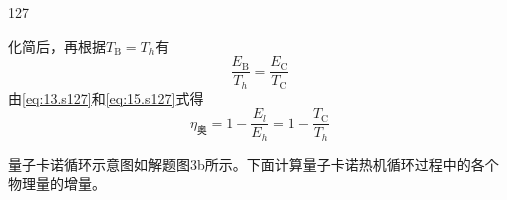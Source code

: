 \begin{solution}{127}
\begin{subsolution}
\begin{equation}
            \label{eq:14.s127}
        \end{equation}
        化简后，再根据$T _ { \mathrm { B } } = T _ { h }$有
        \begin{equation}
            \frac {E _ {\mathrm{B}}}{T _ {h}} = \frac {E _ {\mathrm{C}}}{T _ {\mathrm{C}}}
            \label{eq:15.s127}
        \end{equation}
        由\eqref{eq:13.s127}和\eqref{eq:15.s127}式得
        \begin{equation}
            \eta_ {\text {奥}} = 1 - \frac {E _ {l}}{E _ {h}} = 1 - \frac {T _ {\mathrm{C}}}{T _ {h}}
            \label{eq:16.s127}
        \end{equation}

        量子卡诺循环示意图如解题图3b所示。下面计算量子卡诺热机循环过程中的各个物理量的增量。


\end{subsolution}
\end{solution}

